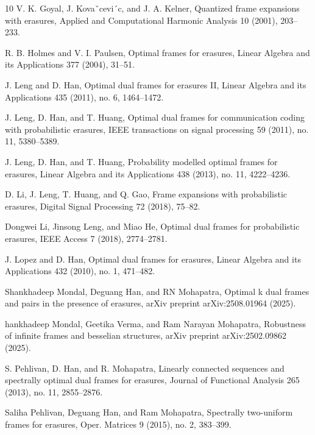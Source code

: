 \documentclass[final,1p,times]{elsarticle}
\begin{document}
\begin{thebibliography}{10}
V. K. Goyal, J. Kovaˇcevi´c, and J. A. Kelner, Quantized frame expansions with erasures, Applied and Computational
Harmonic Analysis 10 (2001), 203–233.

R. B. Holmes and V. I. Paulsen, Optimal frames for erasures, Linear Algebra and its Applications 377 (2004),
31–51.

J. Leng and D. Han, Optimal dual frames for erasures II, Linear Algebra and its Applications 435 (2011), no. 6,
1464–1472.

J. Leng, D. Han, and T. Huang, Optimal dual frames for communication coding with probabilistic erasures, IEEE
transactions on signal processing 59 (2011), no. 11, 5380–5389.


J. Leng, D. Han, and T. Huang, Probability modelled optimal frames for erasures, Linear Algebra and its Applications 438 (2013), no. 11,
4222–4236.

D. Li, J. Leng, T. Huang, and Q. Gao, Frame expansions with probabilistic erasures, Digital Signal Processing 72
(2018), 75–82.

Dongwei Li, Jinsong Leng, and Miao He, Optimal dual frames for probabilistic erasures, IEEE Access 7 (2018),
2774–2781.

J. Lopez and D. Han, Optimal dual frames for erasures, Linear Algebra and its Applications 432 (2010), no. 1,
471–482.

Shankhadeep Mondal, Deguang Han, and RN Mohapatra, Optimal k dual frames and pairs in the presence of
erasures, arXiv preprint arXiv:2508.01964 (2025).

hankhadeep Mondal, Geetika Verma, and Ram Narayan Mohapatra, Robustness of infinite frames and besselian
structures, arXiv preprint arXiv:2502.09862 (2025).

S. Pehlivan, D. Han, and R. Mohapatra, Linearly connected sequences and spectrally optimal dual frames for
erasures, Journal of Functional Analysis 265 (2013), no. 11, 2855–2876.

Saliha Pehlivan, Deguang Han, and Ram Mohapatra, Spectrally two-uniform frames for erasures, Oper. Matrices 9
(2015), no. 2, 383–399.

\end{thebibliography}
\end{document}
